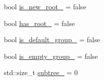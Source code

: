 \begin{DoxyCompactItemize}
\item 
bool \hyperlink{structvt_1_1group_1_1_info_coll_a51b12694202a7bef872694ed9b2f6be3}{is\+\_\+new\+\_\+root\+\_\+} = false
\item 
bool \hyperlink{structvt_1_1group_1_1_info_coll_abc9bebfacc0a99ea16893fce55bf8ffe}{has\+\_\+root\+\_\+} = false
\item 
bool \hyperlink{structvt_1_1group_1_1_info_coll_ab08014fe1c28b172fc4b2b68a5fbc2a1}{is\+\_\+default\+\_\+group\+\_\+} = false
\item 
bool \hyperlink{structvt_1_1group_1_1_info_coll_a79d01c69f5ffe1fc63bc80aba8e1a0f8}{is\+\_\+empty\+\_\+group\+\_\+} = false
\item 
std\+::size\+\_\+t \hyperlink{structvt_1_1group_1_1_info_coll_a42a225abb3f2d734ae4eddaecdb56b9e}{subtree\+\_\+} = 0
\end{DoxyCompactItemize}
